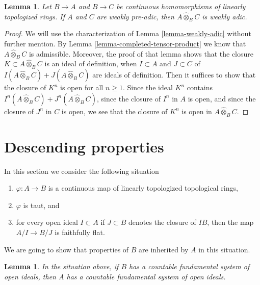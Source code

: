 \documentclass{stacks-project}
\theoremstyle{plain}
\newtheorem{lemma}[subsection]{Lemma}
\theoremstyle{definition}
\theoremstyle{remark}
\numberwithin{equation}{subsection}
\begin{document}
\begin{lemma}
\label{lemma-completed-tensor-product-weakly-adic}
Let $B \to A$ and $B \to C$ be continuous homomorphisms of
linearly topologized rings. If $A$ and $C$ are weakly pre-adic, then
$A \widehat{\otimes}_B C$ is weakly adic.
\end{lemma}

\begin{proof}
We will use the characterization of Lemma \ref{lemma-weakly-adic}
without further mention. By Lemma \ref{lemma-completed-tensor-product}
we know that $A \widehat{\otimes}_B C$ is admissible.
Moreover, the proof of that lemma shows that
the closure $K \subset A \widehat{\otimes}_B C$
is an ideal of definition, when $I \subset A$ and $J \subset C$
of $I(A \widehat{\otimes}_B C) + J(A \widehat{\otimes}_B C)$
are ideals of definition. Then it suffices to show that
the closure of $K^n$ is open for all $n \geq 1$.
Since the ideal $K^n$ contains
$I^n(A \widehat{\otimes}_B C) + J^n(A \widehat{\otimes}_B C)$,
since the closure of $I^n$ in $A$ is open, and
since the closure of $J^n$ in $C$ is open, we
see that the closure of $K^n$ is open in $A \widehat{\otimes}_B C$.
\end{proof}






\section{Descending properties}
\label{section-taut-descent}

\noindent
In this section we consider the following situation
\begin{enumerate}
\item $\varphi : A \to B$ is a continuous map of
linearly topologized topological rings,
\item $\varphi$ is taut, and
\item for every open ideal $I \subset A$ if $J \subset B$
denotes the closure of $IB$, then the map $A/I \to B/J$
is faithfully flat.
\end{enumerate}
We are going to show that properties of $B$ are inherited
by $A$ in this situation.

\begin{lemma}
\label{lemma-taut-descent-countable}
In the situation above, if $B$ has a countable fundamental system of
open ideals, then $A$ has a countable fundamental system of open ideals.
\end{lemma}
\end{document}
